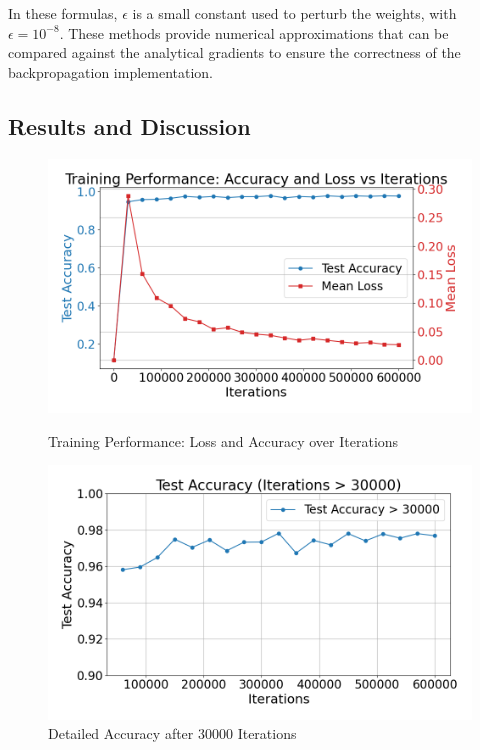In these formulas, \(\epsilon\) is a small constant used to perturb the weights, with \(\epsilon = 10^{-8}\). These methods provide numerical approximations that can be compared against the analytical gradients to ensure the correctness of the backpropagation implementation.


\subsection{Results and Discussion}

\begin{figure}[ht]
    \centering
    \begin{minipage}[t]{0.45\textwidth}
        \centering
        \includegraphics[width=\linewidth]{../data/part1/combined_training_plot}
        \caption{Training Performance: Loss and Accuracy over Iterations}
        \label{fig:combined_training_plot}
    \end{minipage}
    \hfill
    \begin{minipage}[t]{0.45\textwidth}
        \centering
        \includegraphics[width=\linewidth]{../data/part1/accuracy_after30000}
        \caption{Detailed Accuracy after 30000 Iterations}
        \label{fig:accuracy_after30000}
    \end{minipage}
    \hfill
\end{figure}

